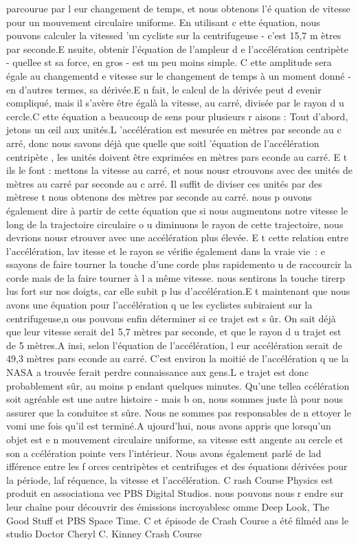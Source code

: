 parcourue par l eur changement de temps, et nous obtenons l'é quation de
vitesse pour un mouvement circulaire uniforme. En utilisant c ette
équation, nous pouvons calculer la vitessed 'un cycliste sur la
centrifugeuse - c'est 15,7 m ètres par seconde.E nsuite, obtenir
l'équation de l'ampleur d e l'accélération centripète - quellee st sa
force, en gros - est un peu moins simple. C ette amplitude sera égale au
changementd e vitesse sur le changement de temps à un moment donné - en
d'autres termes, sa dérivée.E n fait, le calcul de la dérivée peut d
evenir compliqué, mais il s'avère être égalà la vitesse, au carré,
divisée par le rayon d u cercle.C ette équation a beaucoup de sens pour
plusieurs r aisons : Tout d'abord, jetons un œil aux unités.L
'accélération est mesurée en mètres par seconde au c arré, donc nous
savons déjà que quelle que soitl 'équation de l'accélération centripète
, les unités doivent être exprimées en mètres pars econde au carré. E t
ils le font : mettons la vitesse au carré, et nous nousr etrouvons avec
des unités de mètres au carré par seconde au c arré. Il suffit de
diviser ces unités par des mètrese t nous obtenons des mètres par
seconde au carré. nous p ouvons également dire à partir de cette
équation que si nous augmentons notre vitesse le long de la trajectoire
circulaire o u diminuons le rayon de cette trajectoire, nous devrions
nousr etrouver avec une accélération plus élevée. E t cette relation
entre l'accélération, lav itesse et le rayon se vérifie également dans
la vraie vie~: e ssayons de faire tourner la touche d'une corde plus
rapidemento u de raccourcir la corde mais de la faire tourner à l a même
vitesse. nous sentirons la touche tirerp lus fort sur nos doigts, car
elle subit p lus d'accélération.E t maintenant que nous avons une
équation pour l'accélération q ue les cyclistes subiraient sur la
centrifugeuse,n ous pouvons enfin déterminer si ce trajet est s ûr. On
sait déjà que leur vitesse serait de1 5,7 mètres par seconde, et que le
rayon d u trajet est de 5 mètres.A insi, selon l'équation de
l'accélération, l eur accélération serait de 49,3 mètres pars econde au
carré. C'est environ la moitié de l'accélération q ue la NASA a trouvée
ferait perdre connaissance aux gens.L e trajet est donc probablement
sûr, au moins p endant quelques minutes. Qu'une tellea ccélération soit
agréable est une autre histoire - mais b on, nous sommes juste là pour
nous assurer que la conduitee st sûre. Nous ne sommes pas responsables
de n ettoyer le vomi une fois qu'il est terminé.A ujourd'hui, nous avons
appris que lorsqu'un objet est e n mouvement circulaire uniforme, sa
vitesse estt angente au cercle et son a ccélération pointe vers
l'intérieur. Nous avons également parlé de lad ifférence entre les f
orces centripètes et centrifuges et des équations dérivées pour la
période, laf réquence, la vitesse et l'accélération. C rash Course
Physics est produit en associationa vec PBS Digital Studios. nous
pouvons nous r endre sur leur chaîne pour découvrir des émissions
incroyablesc omme Deep Look, The Good Stuff et PBS Space Time. C et
épisode de Crash Course a été filméd ans le studio Doctor Cheryl C.
Kinney Crash Course
